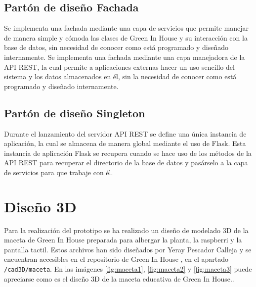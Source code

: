     \subsection{Partón de diseño Fachada}
        Se implementa una fachada mediante una capa de servicios que permite manejar de manera simple y cómoda las clases de Green In House y su interacción con la base de datos, sin necesidad de conocer como está programado y diseñado internamente.
        Se implementa una fachada mediante una capa manejadora de la API REST, la cual permite a aplicaciones externas hacer un uso sencillo del sistema y los datos almacenados en él, sin la necesidad de conocer como está programado y diseñado internamente.
    
    \subsection{Partón de diseño Singleton}
        Durante el lanzamiento del servidor API REST se define una única instancia de aplicación, la cual se almacena de manera global mediante el uso de Flask. Esta instancia de aplicación Flask se recupera cuando se hace uso de los métodos de la API REST para recuperar el directorio de la base de datos y pasárselo a la capa de servicios para que trabaje con él.

\section{Diseño 3D}

Para la realización del prototipo se ha realizado un diseño de modelado 3D de la maceta de Green In House preparada para albergar la planta, la raspberri y la pantalla tactil. Estos archivos han sido diseñados por Yeray Pescador Calleja y se encuentran accesibles en el repositorio de Green In House \cite{GreenInHouse:repo:Maceta}, en el apartado \texttt{/cad3D/maceta}. En las imágenes \ref{fig:maceta1}, \ref{fig:maceta2} y \ref{fig:maceta3} puede apreciarse como es el diseño 3D de la maceta educativa de Green In House..



